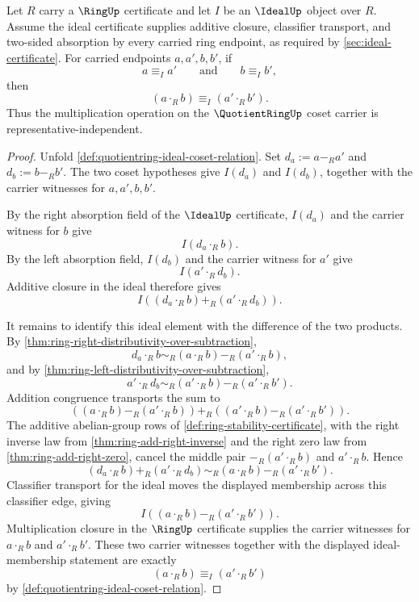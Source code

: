 \begin{theorem}
\label{thm:quotientring-multiplication-descends-to-cosets}
Let $R$ carry a $\RingUp$ certificate and let $I$ be an $\IdealUp$ object over $R$. Assume the ideal certificate supplies additive closure, classifier transport, and two-sided absorption by every carried ring endpoint, as required by \autoref{sec:ideal-certificate}. For carried endpoints $a,a',b,b'$, if
$$
a\equiv_I a'\qquad\text{and}\qquad b\equiv_I b',
$$
then
$$
(a\cdot_R b)\equiv_I(a'\cdot_R b').
$$
Thus the multiplication operation on the $\QuotientRingUp$ coset carrier is representative-independent.
\end{theorem}
\begin{proof}
Unfold \autoref{def:quotientring-ideal-coset-relation}. Set $d_a:=a-_R a'$ and $d_b:=b-_R b'$. The two coset hypotheses give $I(d_a)$ and $I(d_b)$, together with the carrier witnesses for $a,a',b,b'$.

By the right absorption field of the $\IdealUp$ certificate, $I(d_a)$ and the carrier witness for $b$ give
$$
I(d_a\cdot_R b).
$$
By the left absorption field, $I(d_b)$ and the carrier witness for $a'$ give
$$
I(a'\cdot_R d_b).
$$
Additive closure in the ideal therefore gives
$$
I((d_a\cdot_R b)+_R(a'\cdot_R d_b)).
$$

It remains to identify this ideal element with the difference of the two products. By \autoref{thm:ring-right-distributivity-over-subtraction},
$$
d_a\cdot_R b\sim_R(a\cdot_R b)-_R(a'\cdot_R b),
$$
and by \autoref{thm:ring-left-distributivity-over-subtraction},
$$
a'\cdot_R d_b\sim_R(a'\cdot_R b)-_R(a'\cdot_R b').
$$
Addition congruence transports the sum to
$$
((a\cdot_R b)-_R(a'\cdot_R b))+_R((a'\cdot_R b)-_R(a'\cdot_R b')).
$$
The additive abelian-group rows of \autoref{def:ring-stability-certificate}, with the right inverse law from \autoref{thm:ring-add-right-inverse} and the right zero law from \autoref{thm:ring-add-right-zero}, cancel the middle pair $-_R(a'\cdot_R b)$ and $a'\cdot_R b$. Hence
$$
(d_a\cdot_R b)+_R(a'\cdot_R d_b)\sim_R(a\cdot_R b)-_R(a'\cdot_R b').
$$
Classifier transport for the ideal moves the displayed membership across this classifier edge, giving
$$
I((a\cdot_R b)-_R(a'\cdot_R b')).
$$
Multiplication closure in the $\RingUp$ certificate supplies the carrier witnesses for $a\cdot_R b$ and $a'\cdot_R b'$. These two carrier witnesses together with the displayed ideal-membership statement are exactly
$$
(a\cdot_R b)\equiv_I(a'\cdot_R b')
$$
by \autoref{def:quotientring-ideal-coset-relation}.
\end{proof}

